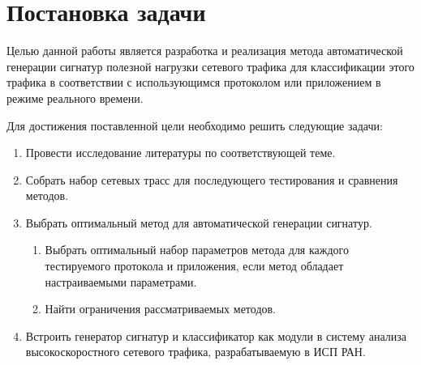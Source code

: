 \section{Постановка задачи}
\label{sec:Chapter1} 

Целью данной работы является разработка и реализация метода автоматической генерации сигнатур полезной нагрузки сетевого трафика
для классификации этого трафика в соответствии с использующимся протоколом или приложением в режиме реального времени.

Для достижения поставленной цели необходимо решить следующие задачи:

\begin{enumerate}
    \item Провести исследование литературы по соответствующей теме.
    \item Собрать набор сетевых трасс для последующего тестирования и сравнения методов.
    \item Выбрать оптимальный метод для автоматической генерации сигнатур.
    \begin{enumerate}
        \item Выбрать оптимальный набор параметров метода для каждого тестируемого протокола и приложения, если метод обладает настраиваемыми параметрами.
        \item Найти ограничения рассматриваемых методов.
    \end{enumerate}
    \item Встроить генератор сигнатур и классификатор как модули в систему анализа высокоскоростного сетевого трафика, разрабатываемую в ИСП РАН.
\end{enumerate}

\newpage
